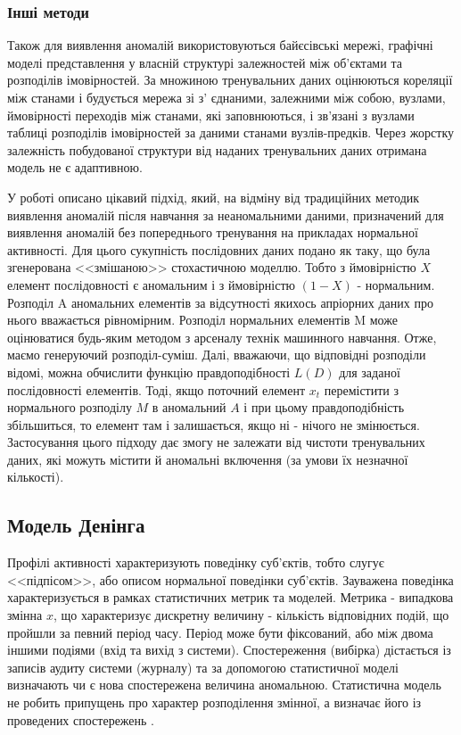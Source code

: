 \subsubsection{Інші методи}

Також для виявлення аномалій використовуються байєсівські мережі,
графічні моделі представлення у власній структурі залежностей між об'єктами та розподілів імовірностей. За множиною тренувальних даних оцінюються кореляції між станами і будується мережа зі з' єднаними, залежними між собою, вузлами, ймовірності переходів між станами, які заповнюються, і зв'язані з вузлами таблиці розподілів імовірностей за даними станами вузлів-предків. Через жорстку залежність побудованої структури від наданих тренувальних даних отримана модель не є адаптивною.

У роботі \cite{eskin2000anomaly} описано цікавий підхід, який, на відміну від традиційних методик виявлення аномалій після навчання за неаномальними даними, призначений для виявлення аномалій без попереднього тренування на прикладах нормальної активності. Для цього сукупність послідовних даних подано як таку, що була згенерована <<змішаною>> стохастичною моделлю. Тобто з ймовірністю $X$ елемент послідовності є аномальним і з ймовірністю $(1-X)$ - нормальним. Розподіл A аномальних елементів за відсутності якихось апріорних даних про нього вважається рівномірним. Розподіл нормальних елементів M може оцінюватися будь-яким методом з арсеналу технік машинного навчання. Отже, маємо генеруючий розподіл-суміш. Далі, вважаючи, що відповідні розподіли відомі, можна обчислити функцію правдоподібності $L(D)$ для заданої послідовності елементів. Тоді, якщо поточний елемент $x_t$ перемістити з нормального розподілу $M$ в аномальний $A$ і при цьому правдоподібність збільшиться, то елемент там і залишається, якщо ні - нічого не змінюється. Застосування цього підходу дає змогу не залежати від чистоти тренувальних даних, які можуть містити й аномальні включення (за умови їх незначної кількості).

\subsection{Модель Денінга}

Профілі активності характеризують поведінку суб'єктів, тобто слугує <<підпісом>>, 
або описом нормальної поведінки суб'єктів. Зауважена поведінка характеризується 
в рамках статистичних метрик та моделей. Метрика - випадкова змінна $x$, що 
характеризує дискретну величину - кількість відповідних подій, що пройшли за 
певний період часу. Період може бути фіксований, або між двома іншими подіями
(вхід та вихід з системи). Спостереження (вибірка) дістається із записів аудиту 
системи (журналу) та за допомогою статистичної моделі визначають чи є нова 
спостережена величина аномальною. Статистична модель не робить припущень про
характер розподілення змінної, а визначає його із проведених
спостережень \cite{denning1987intrusion}.

